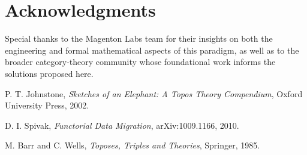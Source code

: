 \documentclass[11pt]{article}
\begin{document}
\section*{Acknowledgments}
Special thanks to the Magenton Labs team for their insights on both the engineering and formal mathematical aspects of this paradigm, as well as to the broader category-theory community whose foundational work informs the solutions proposed here.


\begin{thebibliography}{9}

P. T. Johnstone, 
\emph{Sketches of an Elephant: A Topos Theory Compendium}, 
Oxford University Press, 2002.

D. I. Spivak, 
\emph{Functorial Data Migration}, 
arXiv:1009.1166, 2010.

M. Barr and C. Wells,
\emph{Toposes, Triples and Theories}, 
Springer, 1985.

\end{thebibliography}
\end{document}
